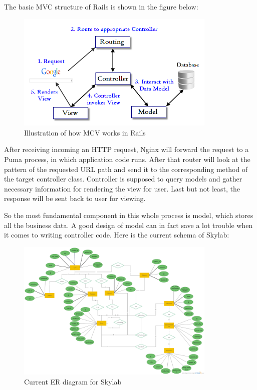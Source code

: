 The basic MVC structure of Rails is shown in the figure below:

\begin{figure}[h]
	\centering
	\includegraphics[width=0.85\textwidth]{Images/Rails_MVC.png}
	\caption{Illustration of how MCV works in Rails}
\end{figure}

After receiving incoming an HTTP request, Nginx will forward the request to a Puma process, in which application code runs. After that router will look at the pattern of the requested URL path and send it to the corresponding method of the target controller class. Controller is supposed to query models and gather necessary information for rendering the view for user. Last but not least, the response will be sent back to user for viewing.

So the most fundamental component in this whole process is model, which stores all the business data. A good design of model can in fact save a lot trouble when it comes to writing controller code. Here is the current schema of Skylab:

\begin{figure}[h]
    \centering
    \includegraphics[width=0.85\textwidth]{Images/Skylab_ER.png}
    \caption{Current ER diagram for Skylab}
\end{figure}

